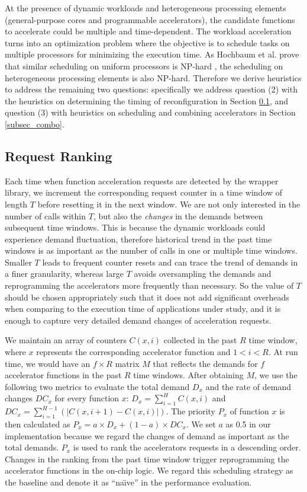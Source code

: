 At the presence of dynamic workloads and heterogeneous processing
elements (general-purpose cores and programmable accelerators), the
candidate functions to accelerate could be multiple and
time-dependent. The workload acceleration turns into an optimization
problem where the objective is to schedule tasks on multiple
processors for minimizing the execution time. As Hochbaum et
al. prove that similar scheduling on uniform processors is NP-hard
\cite{hochbaum88}, the scheduling on heterogeneous processing 
elements is also NP-hard. Therefore we derive heuristics to address
the remaining two questions: specifically we address question (2) with
the heuristics on determining the timing of reconfiguration in
Section \ref{subsec_ranking}, and question (3) with heuristics on
scheduling and combining accelerators in Section \ref{subsec_combo}.

\subsection{Request Ranking}
\label{subsec_ranking}

Each time when function acceleration requests are detected by the
wrapper library, we increment the corresponding request counter in a
time window of length $T$ before resetting it in the next window. 
We are not only interested in the number of calls within $T$, but also the {\em changes} in the demands
between subsequent time windows. This is because the dynamic workloads
could experience demand fluctuation, therefore historical trend in the
past time windows is as important as the number of calls in one or
multiple time windows.
Smaller $T$ leads to frequent counter resets and can trace the trend
of demands in a finer granularity, whereas large $T$ avoids
oversampling the demands and reprogramming the accelerators more
frequently than necessary. So the value of $T$ should be chosen
appropriately such that it does not add significant overheads when
comparing to the execution time of applications under study, and it is
enough to capture very detailed demand changes of acceleration
requests. 

We maintain an array of counters $C(x, i)$ collected in the past $R$
time window, where $x$ represents the corresponding accelerator
function and $1<i<R$. At run time, we would have an $f \times R$
matrix $M$ that reflects the demands for $f$ accelerator functions in
the past $R$ time windows.  After obtaining $M$, we use the following
two metrics to evaluate the total demand $D_x$ and the rate of demand
changes $DC_x$ for every function $x$: $D_{x} = \sum_{i=1}^{H}C(x,i)$
and $DC_{x} = \sum_{i=1}^{H-1}(|C(x, i+1)-C(x, i)|)$.  The priority
$P_x$ of function $x$ is then calculated as $P_x = a \times D_x +
(1-a) \times DC_x$. We set $a$ as 0.5 in our implementation because we
regard the changes of demand as important as the total demands. $P_x$
is used to rank the accelerators requests in a descending
order. Changes in the ranking from the past time window trigger
reprogramming the accelerator functions in the on-chip logic. We regard this scheduling strategy as the baseline and denote it as ``na\"{\i}ve'' in the performance evaluation.




